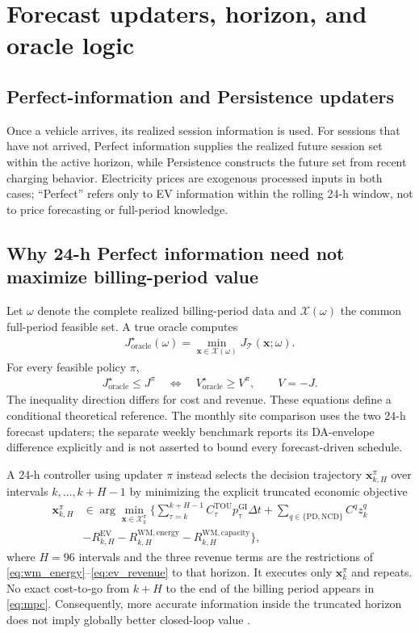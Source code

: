 \documentclass[final,5p,times]{elsarticle}
\newcommand{\dt}{\Delta t}
\newcommand{\EV}{\mathrm{EV}}
\newcommand{\GI}{\mathrm{GI}}
\newcommand{\TOU}{\mathrm{TOU}}
\newcommand{\PD}{\mathrm{PD}}
\newcommand{\NCD}{\mathrm{NCD}}
\newcommand{\WM}{\mathrm{WM}}
\newcommand{\calT}{\mathcal{T}}
\begin{document}
\section{Forecast updaters, horizon, and oracle logic}
\label{sec:oracle_logic}

\subsection{Perfect-information and Persistence updaters}
Once a vehicle arrives, its realized session information is used. For sessions
that have not arrived, Perfect information supplies the realized future session set within
the active horizon, while Persistence constructs the future set from recent
charging behavior. Electricity prices are exogenous processed inputs in both
cases; ``Perfect'' refers only to EV information within the rolling 24-h
window, not to price forecasting or full-period knowledge.

\subsection{Why 24-h Perfect information need not maximize billing-period value}
Let $\omega$ denote the complete realized billing-period data and
$\mathcal{X}(\omega)$ the common full-period feasible set. A true oracle computes
\begin{align}
J_{\mathrm{oracle}}^\star(\omega)
=\min_{\boldsymbol{x}\in\mathcal{X}(\omega)}
J_{\calT}(\boldsymbol{x};\omega). \label{eq:oracle}
\end{align}
For every feasible policy $\pi$,
\begin{align}
J_{\mathrm{oracle}}^\star\le J^\pi
\quad\Longleftrightarrow\quad
V_{\mathrm{oracle}}^\star\ge V^\pi,\qquad V=-J. \label{eq:oracle_dominance}
\end{align}
The inequality direction differs for cost and revenue. These equations define a conditional theoretical reference. The monthly site comparison uses the two 24-h forecast updaters; the separate weekly benchmark reports its DA-envelope difference explicitly and is not asserted to bound every forecast-driven schedule.

A 24-h controller using updater $\pi$ instead selects the decision trajectory
$\boldsymbol{x}_{k,H}^{\pi}$ over intervals $k,\ldots,k+H-1$ by minimizing the
explicit truncated economic objective
\begin{align}
\boldsymbol{x}_{k,H}^{\pi}
&\in\arg\min_{\boldsymbol{x}\in\mathcal X_k^\pi}
\Bigg\{\sum_{\tau=k}^{k+H-1}C_\tau^{\TOU}p_\tau^{\GI}\dt
+\sum_{q\in\{\PD,\NCD\}}C^qz_k^q\nonumber\\
&-R_{k,H}^{\EV}-R_{k,H}^{\WM,\mathrm{energy}}
-R_{k,H}^{\WM,\mathrm{capacity}}\Bigg\}, \label{eq:mpc}
\end{align}
where $H=96$ intervals and the three revenue terms are the restrictions of
\eqref{eq:wm_energy}--\eqref{eq:ev_revenue} to that horizon. It executes only
$\boldsymbol{x}_k^\pi$ and repeats. No exact cost-to-go from $k+H$ to the end
of the billing period appears in \eqref{eq:mpc}. Consequently, more
accurate information inside the truncated horizon does not imply globally
better closed-loop value \cite{rawlings2017mpc}.
\end{document}
